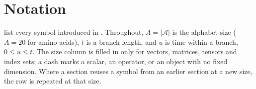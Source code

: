 \documentclass{article}
\newcommand{\Xset}{\mathcal{A}}
\begin{document}

\newpage
\appendix

\newcommand{\notationhead}{\toprule Symbol & Size & Description\\ \midrule}
\newcommand{\nodim}{\textemdash}

\section{Notation}
\label{app:notation}

list every symbol introduced in . Throughout, $A=|\Xset|$ is the alphabet size ($A=20$ for amino
acids), $t$ is a branch length, and $u$ is time within a branch, $0\le u\le t$. The
size column is filled in only for vectors, matrices, tensors and index sets; a dash
marks a scalar, an operator, or an object with no fixed dimension. Where a section
reuses a symbol from an earlier section at a new size, the row is repeated at that
size.
\end{document}
